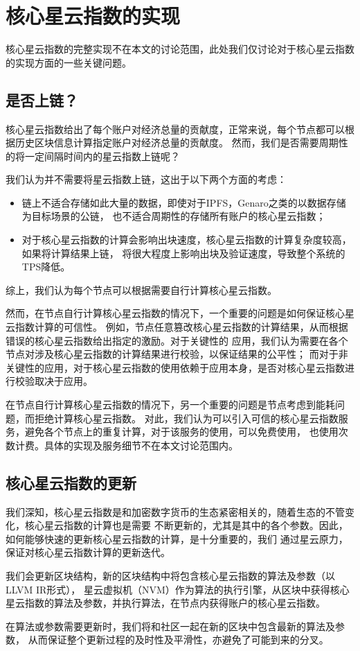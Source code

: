 \section{核心星云指数的实现}
核心星云指数的完整实现不在本文的讨论范围，此处我们仅讨论对于核心星云指数的实现方面的一些关键问题。

\subsection{是否上链？}
核心星云指数给出了每个账户对经济总量的贡献度，正常来说，每个节点都可以根据历史区块信息计算指定账户对经济总量的贡献度。
然而，我们是否需要周期性的将一定间隔时间内的星云指数上链呢？

我们认为并不需要将星云指数上链，这出于以下两个方面的考虑：
\begin{itemize}
\item 链上不适合存储如此大量的数据，即使对于IPFS，Genaro之类的以数据存储为目标场景的公链，
也不适合周期性的存储所有账户的核心星云指数；
\item 对于核心星云指数的计算会影响出块速度，核心星云指数的计算复杂度较高，如果将计算结果上链，
将很大程度上影响出块及验证速度，导致整个系统的TPS降低。
\end{itemize}
\noindent 综上，我们认为每个节点可以根据需要自行计算核心星云指数。

然而，在节点自行计算核心星云指数的情况下，一个重要的问题是如何保证核心星云指数计算的可信性。
例如，节点任意篡改核心星云指数的计算结果，从而根据错误的核心星云指数给出指定的激励。对于关键性的
应用，我们认为需要在各个节点对涉及核心星云指数的计算结果进行校验，以保证结果的公平性；
而对于非关键性的应用，对于核心星云指数的使用依赖于应用本身，是否对核心星云指数进行校验取决于应用。

在节点自行计算核心星云指数的情况下，另一个重要的问题是节点考虑到能耗问题，而拒绝计算核心星云指数。
对此，我们认为可以引入可信的核心星云指数服务，避免各个节点上的重复计算，对于该服务的使用，可以免费使用，
也使用次数计费。具体的实现及服务细节不在本文讨论范围内。

\subsection{核心星云指数的更新}
我们深知，核心星云指数是和加密数字货币的生态紧密相关的，随着生态的不管变化，核心星云指数的计算也是需要
不断更新的，尤其是其中的各个参数。因此，如何能够快速的更新核心星云指数的计算，是十分重要的，我们
通过星云原力，保证对核心星云指数计算的更新迭代。

我们会更新区块结构，新的区块结构中将包含核心星云指数的算法及参数（以LLVM IR形式），
星云虚拟机（NVM）作为算法的执行引擎，从区块中获得核心星云指数的算法及参数，并执行算法，在节点内获得账户的核心星云指数。

在算法或参数需要更新时，我们将和社区一起在新的区块中包含最新的算法及参数，
从而保证整个更新过程的及时性及平滑性，亦避免了可能到来的分叉。


%
